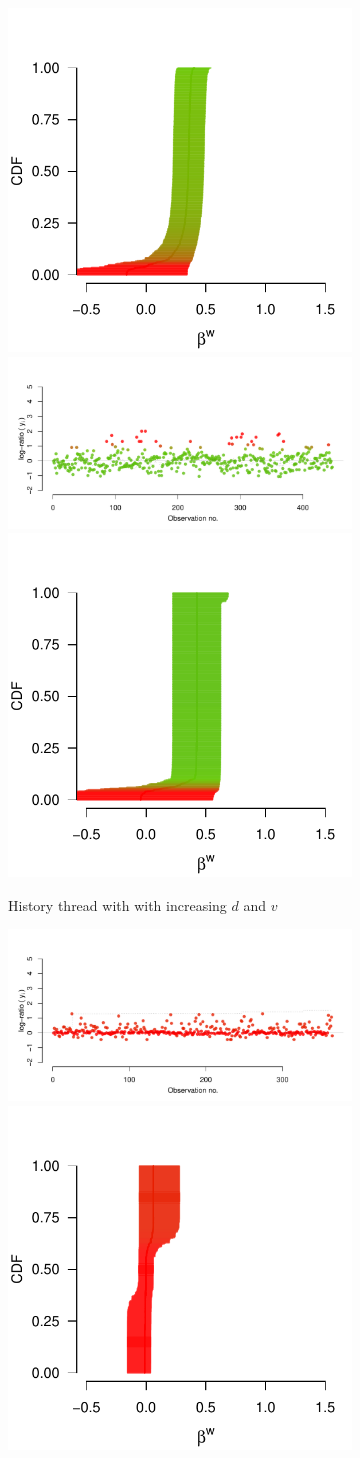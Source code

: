 \documentclass[9pt,a4paper,twocolumn,lineno]{article}
\begin{document}
\begin{figure}
\begin{subfigure}{.44\linewidth}
		\includegraphics[width=.28\linewidth]{beta_history_148_3}
		\includegraphics[width=.7\linewidth]{thread_history_403_9}	
		\includegraphics[width=.28\linewidth]{beta_history_403_9}
		\caption{\footnotesize History thread with with increasing $d$ and $v$}
		\label{fig:supp hist}
	\end{subfigure}
	\begin{subfigure}{.44\linewidth}
		\includegraphics[width=.7\linewidth]{thread_max_55_1.pdf}
		\includegraphics[width=.28\linewidth]{beta_max_55_1.pdf}	

\end{subfigure}
\end{figure}
\end{document}
